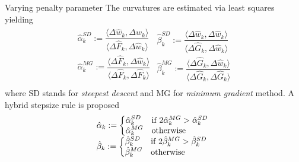 \documentclass[8pt,red]{beamer}
\theoremstyle{plain}
\theoremstyle{definition}
\theoremstyle{remark}
\begin{document}
\begin{frame}{Varying penalty parameter}
The curvatures are estimated via least squares yielding
\begin{align}
\begin{array}{l}
  \hat{\alpha}_{k}^{SD} := \dfrac{\langle \Delta \hat{w}_{k} , \Delta \hat{w}_{k} \rangle}{\langle \Delta \hat{F}_{k} , \Delta \hat{w}_{k} \rangle} \\
  \hat{\alpha}_{k}^{MG} := \dfrac{\langle \Delta \hat{F}_{k} , \Delta \hat{w}_{k} \rangle}{\langle \Delta \hat{F}_{k} , \Delta \hat{F}_{k} \rangle} \\
\end{array}  
\begin{array}{l}
  \hat{\beta}_{k}^{SD} := \dfrac{\langle \Delta \hat{w}_{k} , \Delta \hat{w}_{k} \rangle}{\langle \Delta \hat{G}_{k} , \Delta \hat{w}_{k} \rangle} \\
  \hat{\beta}_{k}^{MG} := \dfrac{\langle \Delta \hat{G}_{k} , \Delta \hat{w}_{k} \rangle}{\langle \Delta \hat{G}_{k} , \Delta \hat{G}_{k} \rangle}
\end{array}
\end{align}
where SD stands for \textit{steepest descent} and MG for \textit{minimum gradient} method. A hybrid stepsize rule is proposed
\begin{align}
\begin{array}{l}
  \hat{\alpha}_{k} := 
  \begin{dcases*}
	\hat{\alpha}_{k}^{SD}
    & if $ 2 \hat{\alpha}_{k}^{MG} > \hat{\alpha}_{k}^{SD} $ \\
    \hat{\alpha}_{k}^{MG}
    & otherwise \\
  \end{dcases*}  \\
  \hat{\beta}_{k} := 
  \begin{dcases*}
	\hat{\beta}_{k}^{SD}
    & if $ 2 \hat{\beta}_{k}^{MG} > \hat{\beta}_{k}^{SD} $ \\
    \hat{\beta}_{k}^{MG}
    & otherwise \\
  \end{dcases*} 
\end{array}  
\end{align}
\end{frame}
\end{document}
